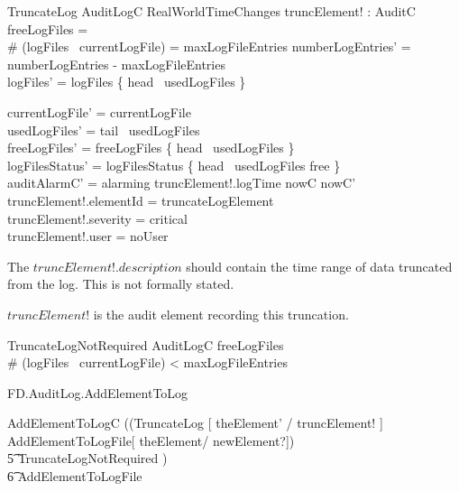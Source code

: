 \begin{schema}{TruncateLog}
        \Delta AuditLogC
\also   
        RealWorldTimeChanges
\also
        truncElement! : AuditC
\where
        freeLogFiles = \emptyset
\\      \# (logFiles~ currentLogFile) = maxLogFileEntries
\also
        numberLogEntries' = numberLogEntries - maxLogFileEntries
\\      logFiles' = logFiles \oplus \{ head~ usedLogFiles \mapsto
\emptyset \}

\also      
        currentLogFile' = currentLogFile
\\      usedLogFiles' = tail~ usedLogFiles
\\      freeLogFiles' = freeLogFiles \cup \{ head~ usedLogFiles \} 
\\      logFilesStatus' = logFilesStatus \oplus \{ head~ usedLogFiles
\mapsto free \}
\\      auditAlarmC' = alarming
\also
        truncElement!.logTime \in nowC \upto nowC'
\\      truncElement!.elementId = truncateLogElement
\\      truncElement!.severity = critical  
\\      truncElement!.user = noUser   
\end{schema}
\begin{Zcomment}
\item
The $truncElement!.description$ should contain the time range of data truncated from
the log. This is not formally stated.
\item
$truncElement!$ is the audit element recording this truncation.
\end{Zcomment}

\begin{schema}{TruncateLogNotRequired}
        \Xi AuditLogC
\where
        freeLogFiles \neq \emptyset
\\      \lor \# (logFiles~ currentLogFile) < maxLogFileEntries
\end{schema}

\begin{traceunit}{FD.AuditLog.AddElementToLog}
\end{traceunit}

\begin{zed}
AddElementToLogC  ((TruncateLog [ theElement' / truncElement! ] \semi
AddElementToLogFile[ theElement/ newElement?]) 
\\ \t5 \lor TruncateLogNotRequired ) 
\\ \t6 \semi AddElementToLogFile
\end{zed}


